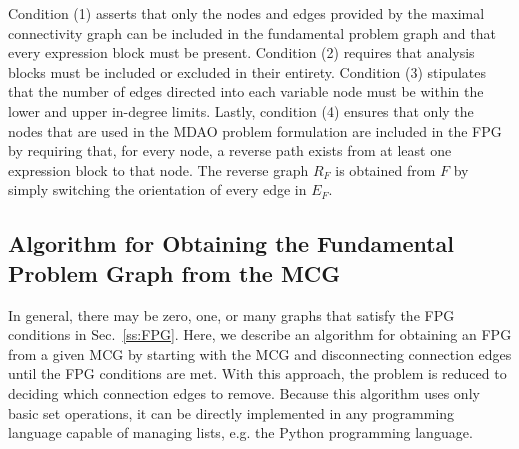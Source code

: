     Condition (1) asserts that only the nodes and edges provided by the maximal connectivity graph can be included in the fundamental problem graph and that every expression block must be present. 
    Condition (2) requires that analysis blocks must be included or excluded in their entirety. 
    Condition (3) stipulates that the number of edges directed into each variable node must be within the lower and upper in-degree limits.
    Lastly, condition (4) ensures that only the nodes that are used in the MDAO problem formulation are included in the FPG by requiring that, for every node, a reverse path exists from at least one expression block to that node. 
    The reverse graph $R_F$ is obtained from $F$ by simply switching the orientation of every edge in $E_F$.


\subsection{Algorithm for Obtaining the Fundamental Problem Graph from the MCG}
    \label{ss:obtaining FPG}
    In general, there may be zero, one, or many graphs that satisfy the FPG conditions in Sec.~\ref{ss:FPG}.
    Here, we describe an algorithm for obtaining an FPG from a given MCG by starting with the MCG and disconnecting connection edges until the FPG conditions are met. 
    With this approach, the problem is reduced to deciding which connection edges to remove. Because this algorithm uses only basic set operations, it can be directly implemented in any programming language capable of managing lists, e.g. the Python programming language.

